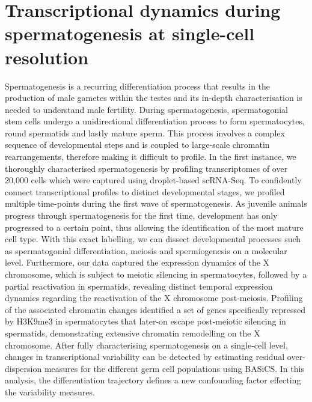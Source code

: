 
\chapter{Transcriptional dynamics during spermatogenesis at single-cell resolution}  

\graphicspath{{"../../Dropbox (Cambridge  University)/Figures_for_thesis/Chapter3/"}}

\vspace*{\fill}

\begin{Abstract}
Spermatogenesis is a recurring differentiation process that results in the production of male gametes within the testes and its in-depth characterisation is needed to understand male fertility. During spermatogenesis, spermatogonial stem cells undergo a unidirectional differentiation process to form spermatocytes, round spermatids and lastly mature sperm. This process involves a complex sequence of developmental steps and is coupled to large-scale chromatin rearrangements, therefore making it difficult to profile.
In the first instance, we thoroughly characterised spermatogenesis by   profiling transcriptomes of over 20,000 cells which were captured using droplet-based scRNA-Seq. To confidently connect transcriptional profiles to distinct developmental stages, we profiled multiple time-points during the first wave of spermatogenesis. As juvenile animals progress through spermatogenesis for the first time, development has only progressed to a certain point, thus allowing the identification of the most mature cell type. With this exact labelling, we can dissect developmental processes such as spermatogonial differentiation, meiosis and spermiogenesis on a molecular level. Furthermore, our data captured the expression dynamics of the X chromosome, which is subject to meiotic silencing in spermatocytes, followed by a partial reactivation in spermatids, revealing distinct temporal expression dynamics regarding the reactivation of the X chromosome post-meiosis. Profiling of the associated chromatin changes identified a set of genes specifically repressed by H3K9me3 in spermatocytes that later-on escape post-meiotic silencing in spermatids, demonstrating extensive chromatin remodelling on the X chromosome. After fully characterising spermatogenesis on a single-cell level, changes in transcriptional variability can be detected by estimating residual over-dispersion measures for the different germ cell populations using BASiCS. In this analysis, the differentiation trajectory defines a new confounding factor effecting the variability measures.  
\end{Abstract}

